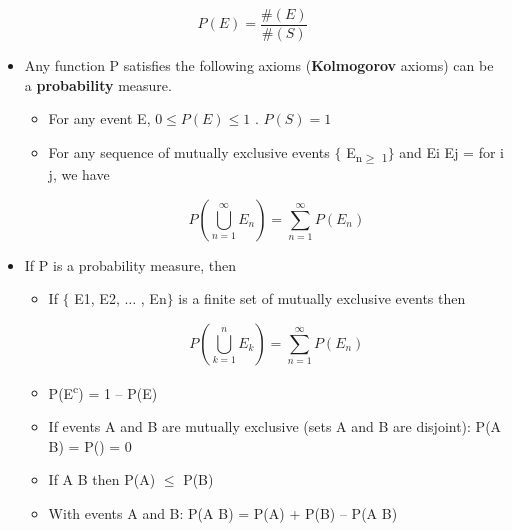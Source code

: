 \documentclass[12pt]{report}
\renewcommand{\_}{\kern-1.5pt\textunderscore\kern-1.5pt}
\begin{document}
\begin{adjustwidth}{1.0in}{0.0in}
 \[ P \left( E \right) =\frac{\# \left( E \right) }{\# \left( S \right) } \] \par

\end{adjustwidth}

\begin{itemize}
	\item Any function P satisfies the following axioms (\textbf{Kolmogorov} axioms) can be a \textbf{probability} measure.\par

\begin{itemize}
	\item For any event E,  \( 0 \leq P \left( E \right)  \leq 1 \) .  \( P \left( S \right) =1 \) \par

	\item For any sequence of mutually exclusive events $ \{ $ E\textsubscript{n$ \geq $ 1}$ \} $  and Ei  Ej =  for i  j, we have\par

 \[ P \left(  \bigcup_{n=1}^{\infty}E_{n} \right) = \sum _{n=1}^{\infty}P \left( E_{n} \right)  \] \par


\end{itemize}
	\item If P is a probability measure, then\par

\begin{itemize}
	\item If $ \{ $ E1, E2, $ \ldots $ , En$ \} $  is a finite set of mutually exclusive events then \par

 \[ P \left(  \bigcup_{k=1}^{n}E_{k} \right) = \sum _{n=1}^{\infty}P \left( E_{n} \right)  \] \par

	\item P(E\textsuperscript{c}) = 1 – P(E)\par

	\item If events A and B are mutually exclusive (sets A and B are disjoint): P(A  B) = P() = 0 \par

	\item If A  B then P(A) $ \leq $  P(B)\par

	\item With events A and B: P(A  B) = P(A) + P(B) – P(A  B) \par


\end{itemize}
\end{itemize}
\end{document}
